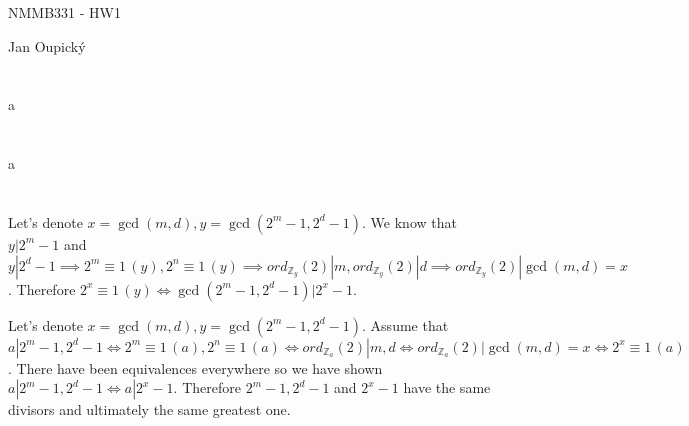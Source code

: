 \documentclass[12pt, a4paper]{article}
\begin{document}
\begin{center}
\large NMMB331 - HW1

\normalsize Jan Oupický
\end{center}
\vspace{1\baselineskip}

\section{}
a

\section{}
a

\section{}
Let's denote $x = \gcd(m,d), y = \gcd(2^m-1, 2^d-1)$. We know that $y | 2^m-1$ and $y | 2^d-1 \implies 2^m \equiv 1 \, (y), 2^n \equiv 1 \, (y) \implies ord_{\mathbb{Z}_y}(2)|m, ord_{\mathbb{Z}_y}(2)|d \implies ord_{\mathbb{Z}_y}(2)|\gcd(m,d)=x$. Therefore $2^x \equiv 1 \, (y) \iff \gcd(2^m-1, 2^d-1) | 2^x-1$.

Let's denote $x = \gcd(m,d), y = \gcd(2^m-1, 2^d-1)$. Assume that $a | 2^m-1, 2^d-1 \iff 2^m \equiv 1 \, (a), 2^n \equiv 1 \, (a) \iff ord_{\mathbb{Z}_a}(2)|m,d \iff ord_{\mathbb{Z}_a}(2)|\gcd(m,d)=x \iff 2^x \equiv 1 \, (a)$. There have been equivalences everywhere so we have shown $a | 2^m-1, 2^d-1 \iff a | 2^x-1$. Therefore $ 2^m-1, 2^d-1$ and $2^x-1$ have the same divisors and ultimately the same greatest one.
\end{document}
